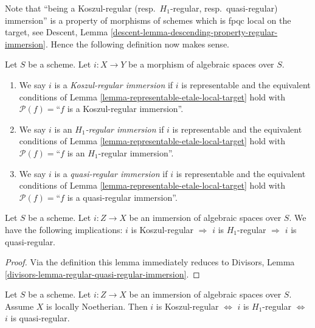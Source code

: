 \noindent
Note that ``being a Koszul-regular (resp.\ $H_1$-regular, resp.\ quasi-regular)
immersion'' is a property of morphisms of schemes which is fpqc local on the
target, see
Descent, Lemma \ref{descent-lemma-descending-property-regular-immersion}.
Hence the following definition now makes sense.

\begin{definition}
\label{definition-regular-immersion}
Let $S$ be a scheme. Let $i : X \to Y$ be a morphism of algebraic
spaces over $S$.
\begin{enumerate}
\item We say $i$ is a {\it Koszul-regular immersion} if $i$ is representable
and the equivalent conditions of
Lemma \ref{lemma-representable-etale-local-target}
hold with $\mathcal{P}(f) =$``$f$ is a Koszul-regular immersion''.
\item We say $i$ is an {\it $H_1$-regular immersion} if $i$ is representable
and the equivalent conditions of
Lemma \ref{lemma-representable-etale-local-target}
hold with $\mathcal{P}(f) =$``$f$ is an $H_1$-regular immersion''.
\item We say $i$ is a {\it quasi-regular immersion} if $i$ is representable
and the equivalent conditions of
Lemma \ref{lemma-representable-etale-local-target}
hold with $\mathcal{P}(f) =$``$f$ is a quasi-regular immersion''.
\end{enumerate}
\end{definition}

\begin{lemma}
\label{lemma-regular-quasi-regular-immersion}
Let $S$ be a scheme.
Let $i : Z \to X$ be an immersion of algebraic spaces over $S$.
We have the following implications:
$i$ is Koszul-regular $\Rightarrow$
$i$ is $H_1$-regular $\Rightarrow$
$i$ is quasi-regular.
\end{lemma}

\begin{proof}
Via the definition this lemma immediately reduces to
Divisors, Lemma \ref{divisors-lemma-regular-quasi-regular-immersion}.
\end{proof}

\begin{lemma}
\label{lemma-regular-immersion-noetherian}
Let $S$ be a scheme.
Let $i : Z \to X$ be an immersion of algebraic spaces over $S$.
Assume $X$ is locally Noetherian. Then
$i$ is Koszul-regular $\Leftrightarrow$
$i$ is $H_1$-regular $\Leftrightarrow$
$i$ is quasi-regular.
\end{lemma}

